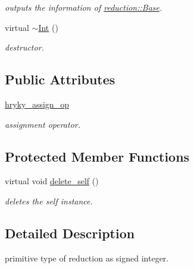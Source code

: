 \begin{DoxyCompactItemize}
\begin{DoxyCompactList}\small\item\em outputs the information of \hyperlink{classhryky_1_1reduction_1_1_base}{reduction\-::\-Base}. \end{DoxyCompactList}\item 
\hypertarget{classhryky_1_1reduction_1_1_int_a96f848c3879a470731ecacec7404ce93}{virtual \hyperlink{classhryky_1_1reduction_1_1_int_a96f848c3879a470731ecacec7404ce93}{$\sim$\-Int} ()}\label{classhryky_1_1reduction_1_1_int_a96f848c3879a470731ecacec7404ce93}

\begin{DoxyCompactList}\small\item\em destructor. \end{DoxyCompactList}\end{DoxyCompactItemize}
\subsection*{Public Attributes}
\begin{DoxyCompactItemize}
\item 
\hypertarget{classhryky_1_1reduction_1_1_int_a9adbc42b86231375d9e8e26c0a999d33}{\hyperlink{classhryky_1_1reduction_1_1_int_a9adbc42b86231375d9e8e26c0a999d33}{hryky\-\_\-assign\-\_\-op}}\label{classhryky_1_1reduction_1_1_int_a9adbc42b86231375d9e8e26c0a999d33}

\begin{DoxyCompactList}\small\item\em assignment operator. \end{DoxyCompactList}\end{DoxyCompactItemize}
\subsection*{Protected Member Functions}
\begin{DoxyCompactItemize}
\item 
virtual void \hyperlink{classhryky_1_1reduction_1_1_base_a100265b04179500cd7901c8afea64eb0}{delete\-\_\-self} ()
\begin{DoxyCompactList}\small\item\em deletes the self instance. \end{DoxyCompactList}\end{DoxyCompactItemize}


\subsection{Detailed Description}
primitive type of reduction as signed integer. 

